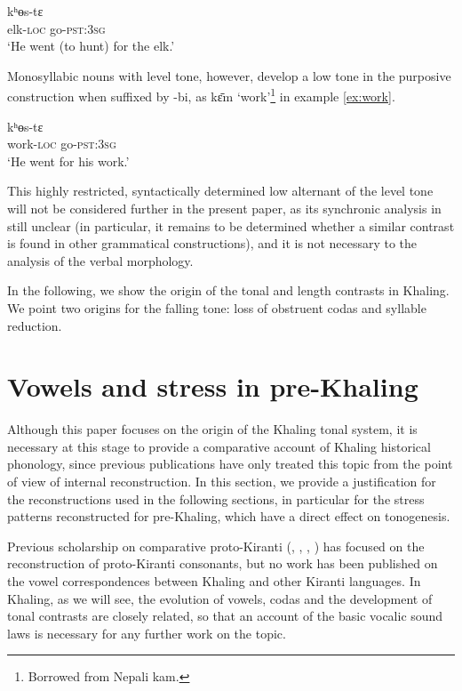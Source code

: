 \documentclass[oldfontcommands,oneside,a4paper,11pt]{article}
\newcommand{\ipa}[1]{{\phon \mbox{#1}}} %
\begin{document}
\begin{exe}
\ex \label{ex:elk}
\gll   \ipa{kɛ̂m-bi} \ipa{kʰɵs-tɛ}  \\
elk-\textsc{loc} go-\textsc{pst:3sg} \\
\glt `He went (to hunt) for the elk.'
\end{exe}


Monosyllabic nouns with level tone, however, develop a low tone in the purposive construction when suffixed by \ipa{-bi}, as \ipa{kɛ̄m}  `work'\footnote{Borrowed from Nepali \ipa{kam}.} in example \ref{ex:work}.
\begin{exe}
\ex \label{ex:work}
\gll   \ipa{kɛ̀m-bi} \ipa{kʰɵs-tɛ}  \\
work-\textsc{loc} go-\textsc{pst:3sg} \\
\glt `He went for his work.'
\end{exe}


This highly restricted, syntactically determined low alternant of the level tone will not be considered further in the present paper, as its synchronic analysis in still unclear (in particular, it remains to be determined whether a similar contrast is found in other grammatical constructions), and it is not necessary to the analysis of the verbal morphology.


In the following, we show the origin of the tonal and length contrasts in Khaling. We point  two origins for the falling tone: loss of obstruent codas and syllable reduction.

\section{Vowels and stress in pre-Khaling}

Although this paper focuses on the origin of the Khaling tonal system, it is necessary at this stage to provide a comparative account of Khaling historical phonology, since previous publications have only treated this topic from the point of view of internal reconstruction. In this section, we provide a justification for the reconstructions used in the following sections,   in particular   for the stress patterns reconstructed for pre-Khaling, which have a direct effect on tonogenesis.

Previous scholarship on comparative proto-Kiranti (\citealt{driem90r}, \citealt{michailovsky94stops}, \citealt{starostin94kiranti}, \citealt{opgenort05jero}) has focused on the reconstruction of proto-Kiranti consonants, but no work has been published on the vowel correspondences between Khaling and other Kiranti languages. In Khaling, as we will see, the evolution of vowels, codas and the development of tonal contrasts are closely related, so that an account of the basic vocalic sound laws is necessary for any further work on the topic.
\end{document}
